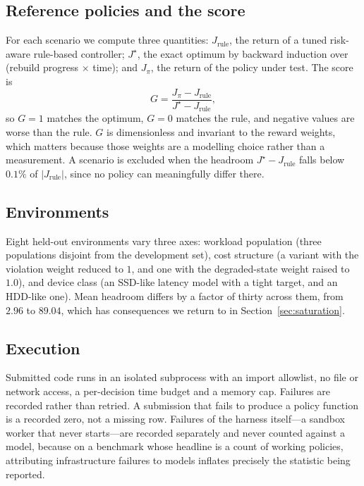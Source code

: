 \documentclass[conference]{IEEEtran}
\newcommand{\G}{\ensuremath{G}}
\begin{document}
\subsection{Reference policies and the score}

For each scenario we compute three quantities: $J_{\text{rule}}$, the return of a tuned
risk-aware rule-based controller; $J^\star$, the exact optimum by backward induction over
(rebuild progress $\times$ time); and $J_\pi$, the return of the policy under test. The
score is
\begin{equation}
\G = \frac{J_\pi - J_{\text{rule}}}{J^\star - J_{\text{rule}}} ,
\end{equation}
so $\G = 1$ matches the optimum, $\G = 0$ matches the rule, and negative values are worse
than the rule. $\G$ is dimensionless and invariant to the reward weights, which matters
because those weights are a modelling choice rather than a measurement. A scenario is
excluded when the headroom $J^\star - J_{\text{rule}}$ falls below $0.1\%$ of
$|J_{\text{rule}}|$, since no policy can meaningfully differ there.

\subsection{Environments}

Eight held-out environments vary three axes: workload population (three populations
disjoint from the development set), cost structure (a variant with the violation weight
reduced to $1$, and one with the degraded-state weight raised to $1.0$), and device class
(an SSD-like latency model with a tight target, and an HDD-like one). Mean headroom
differs by a factor of thirty across them, from $2.96$ to $89.04$, which has consequences
we return to in Section~\ref{sec:saturation}.

\subsection{Execution}

Submitted code runs in an isolated subprocess with an import allowlist, no file or network
access, a per-decision time budget and a memory cap. Failures are recorded rather than
retried. A submission that fails to produce a policy function is a recorded zero, not a
missing row. Failures of the harness itself---a sandbox worker that never starts---are
recorded separately and never counted against a model, because on a benchmark whose
headline is a count of working policies, attributing infrastructure failures to models
inflates precisely the statistic being reported.
\end{document}
